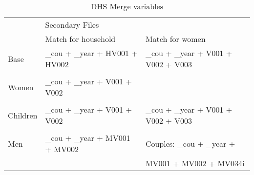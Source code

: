 \documentclass{article}[11pt,subeqn]
\begin{document}
\begin{spacing}{1.25}
\begin{table}[htpb!]
\begin{center}
\caption{DHS Merge variables}
\label{tab:merge}
\begin{tabular}{lll} 
\toprule
& \multicolumn{2}{l}{Secondary Files} \\ \cmidrule{2-3}
& Match for household & Match for women \\
\midrule
Base & \_cou + \_year + HV001 + HV002 & \_cou + \_year + V001 + V002 + V003 \\
\begin{footnotesize} \end{footnotesize} & \begin{footnotesize} \end{footnotesize} & \begin{footnotesize} \end{footnotesize} \\
Women & \_cou + \_year + V001 + V002 &  \\
\begin{footnotesize} \end{footnotesize} & \begin{footnotesize} \end{footnotesize} & \begin{footnotesize} \end{footnotesize} \\
Children & \_cou + \_year + V001 + V002 & \_cou + \_year + V001 + V002 + V003 \\
\begin{footnotesize} \end{footnotesize} & \begin{footnotesize} \end{footnotesize} & \begin{footnotesize} \end{footnotesize} \\
Men & \_cou + \_year + MV001 + MV002 & Couples:  \_cou + \_year + \\
 & &  MV001 + MV002 + MV034i\\
\bottomrule
\end{tabular}
\end{center}
\end{table}


\end{spacing}
\end{document}
